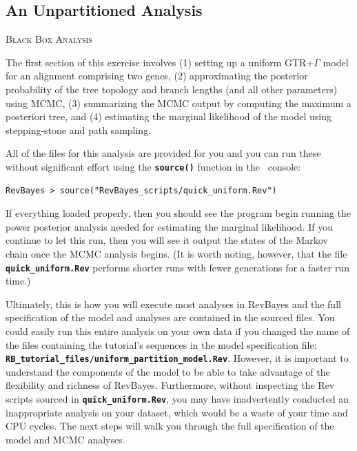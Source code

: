 \documentclass[11pt]{article}
\newcommand{\cl}[1]{{\texttt{\textbf{#1}}}}
\begin{document}
\bigskip
\subsection{An Unpartitioned Analysis}\label{secUnif} 

{\large \textcolor{mycol}{\textsc{Black Box Analysis}}}

The first section of this exercise involves 
(1) setting up a uniform GTR+$\Gamma$ model for an alignment comprising two genes, 
(2) approximating the posterior probability of the tree topology and branch lengths (and all other parameters) using MCMC,  
(3) summarizing the MCMC output by computing the maximum a posteriori tree, and
(4) estimating the marginal likelihood of the model using stepping-stone and path sampling. 

All of the files for this analysis are provided for you and you can run these without significant effort using the \cl{source()} function in the \RevBayes~console:
{\tt \begin{snugshade*}
\begin{lstlisting}
RevBayes > source("RevBayes_scripts/quick_uniform.Rev")
\end{lstlisting}
\end{snugshade*}}

If everything loaded properly, then you should see the program begin running the power posterior analysis needed for estimating the marginal likelihood. If you continue to let this run, then you will see it output the states of the Markov chain once the MCMC analysis begins. (It is worth noting, however, that the file \cl{quick\_uniform.Rev} performs shorter runs with fewer generations for a faster run time.)

Ultimately, this is how you will execute most analyses in RevBayes and the full specification of the model and analyses are contained in the sourced files. 
You could easily run this entire analysis on your own data if you changed the name of the files containing the tutorial's sequences in the model specification file: \cl{RB\_tutorial\_files/uniform\_partition\_model.Rev}. 
However, it is important to understand the components of the model to be able to take advantage of the flexibility and richness of RevBayes.
Furthermore, without inspecting the Rev scripts sourced in \cl{quick\_uniform.Rev}, you may have inadvertently conducted an inappropriate analysis on your dataset, which would be a waste of your time and CPU cycles. 
The next steps will walk you through the full specification of the model and MCMC analyses. 
\end{document}
